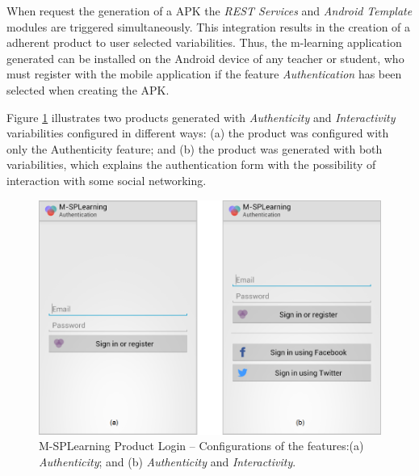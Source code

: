 When request the generation of a APK the \textit{REST Services} and \textit{Android Template} modules are triggered simultaneously. This integration results in the creation of a adherent product to user selected variabilities. Thus, the m-learning application generated can be installed on the Android device of any teacher or student, who must register with the mobile application if the feature \textit{Authentication} has been selected when creating the APK.

Figure \ref{figureMSPLLogin} illustrates two products generated with \textit{Authenticity} and \textit{Interactivity} variabilities configured in different ways: (a) the product was configured with only the Authenticity feature; and (b) the product was generated with both variabilities, which explains the authentication form with the possibility of interaction with some social networking.

\begin{figure}[!ht]
\centering
\includegraphics[scale=0.335]{figures/section3/MSPLLogin}
\caption{M-SPLearning Product Login -- Configurations of the features:\newline(a) \textit{Authenticity}; and (b) \textit{Authenticity} and \textit{Interactivity}.}
\label{figureMSPLLogin}
\end{figure}

